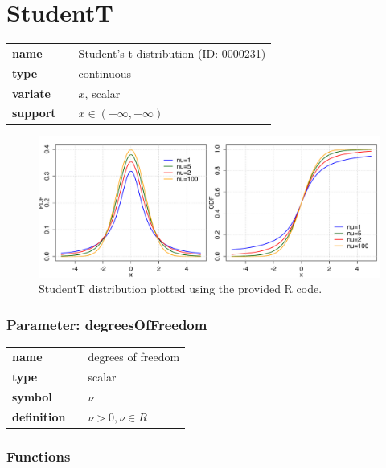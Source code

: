 \section*{StudentT} 

  \bigskip 

\begin{tabular}{p{2cm}cl}
\textbf{name} & & Student's t-distribution (ID: 0000231)\\ 
 
\textbf{type} & & continuous \\ 

\textbf{variate} & & $x$, scalar \\ 

\textbf{support} & & $x \in (-\infty,+\infty)$
\end{tabular}

\begin{figure}[ht!]
\centering
  \includegraphics[width=140mm]{pics/StudentT.pdf}
 \caption{StudentT distribution plotted using the provided R code.}
 \label{fig:StudentT}
\end{figure}

\subsubsection*{Parameter: degreesOfFreedom}

\noindent\begin{tabular}{p{2cm}cl}
\textbf{name} & & degrees of freedom \\
\textbf{type} & & scalar \\
\textbf{symbol} & & $\nu$  \\
\textbf{definition} & & $\nu > 0, \nu \in  R$
\end{tabular}
\subsubsection*{Functions}

